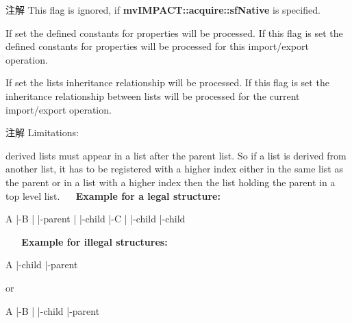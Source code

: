 \begin{Desc}
\begin{description}
\begin{DoxyNote}{注解}
This flag is ignored, if {\bfseries mv\+I\+M\+P\+A\+C\+T\+::acquire\+::sf\+Native} is specified. 
\end{DoxyNote}
\item[{\em 
\hypertarget{group___common_interface_gga9390ccf3b2ebe68eee998798d59dc823af7164bb6960a177558c2ab09e6bf6d69}{sf\+Process\+Prop\+Constants\+Dict}\label{group___common_interface_gga9390ccf3b2ebe68eee998798d59dc823af7164bb6960a177558c2ab09e6bf6d69}
}]If set the defined constants for properties will be processed. If this flag is set the defined constants for properties will be processed for this import/export operation. \item[{\em 
\hypertarget{group___common_interface_gga9390ccf3b2ebe68eee998798d59dc823a18bdc6bbfcdd156cffaf47314b03a98e}{sf\+Process\+Inheritance}\label{group___common_interface_gga9390ccf3b2ebe68eee998798d59dc823a18bdc6bbfcdd156cffaf47314b03a98e}
}]If set the lists inheritance relationship will be processed. If this flag is set the inheritance relationship between lists will be processed for the current import/export operation.

\begin{DoxyNote}{注解}
Limitations\+:
\begin{DoxyItemize}
\item derived lists must appear in a list after the parent list. So if a list is derived from another list, it has to be registered with a higher index either in the same list as the parent or in a list with a higher index then the list holding the parent in a top level list.~\newline
~\newline
 {\bfseries Example for a legal structure\+:} 
\begin{DoxyCode}
A
|-B
| |-parent
| |-child
|-C
| |-child
|-child
\end{DoxyCode}
 ~\newline
~\newline
 {\bfseries Example for illegal structures\+:} 
\begin{DoxyCode}
A
|-child
|-parent
\end{DoxyCode}
 or 
\begin{DoxyCode}
A
|-B
| |-child
|-parent
\end{DoxyCode}


\end{DoxyItemize}
\end{DoxyNote}
\end{description}
\end{Desc}
